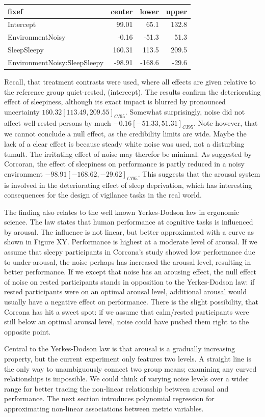 \documentclass[]{svmono}
\theoremstyle{definition}
\theoremstyle{definition}
\theoremstyle{definition}
\theoremstyle{remark}
\begin{document}
\begin{longtable}[]{@{}lrrr@{}}
\toprule
fixef & center & lower & upper\tabularnewline
\midrule
\endhead
Intercept & 99.01 & 65.1 & 132.8\tabularnewline
EnvironmentNoisy & -0.16 & -51.3 & 51.3\tabularnewline
SleepSleepy & 160.31 & 113.5 & 209.5\tabularnewline
EnvironmentNoisy:SleepSleepy & -98.91 & -168.6 & -29.6\tabularnewline
\bottomrule
\end{longtable}

Recall, that treatment contrasts were used, where all effects are given
relative to the reference group quiet-rested, (intercept). The results
confirm the deteriorating effect of sleepiness, although its exact
impact is blurred by pronounced uncertainty
\(160.32 [113.49, 209.55]_{CI95}\). Somewhat surprisingly, noise did not
affect well-rested persons by much \(-0.16 [-51.33, 51.31]_{CI95}\).
Note however, that we cannot conclude a null effect, as the credibility
limits are wide. Maybe the lack of a clear effect is because steady
white noise was used, not a disturbing tumult. The irritating effect of
noise may therefor be minimal. As suggested by Corcoran, the effect of
sleepiness on performance is partly reduced in a noisy environment
\(-98.91 [-168.62, -29.62]_{CI95}\). This suggests that the arousal
system is involved in the deteriorating effect of sleep deprivation,
which has interesting consequences for the design of vigilance tasks in
the real world.

The finding also relates to the well known Yerkes-Dodson law in
ergonomic science. The law states that human performance at cognitive
tasks is influenced by arousal. The influence is not linear, but better
approximated with a curve as shown in Figure XY. Performance is highest
at a moderate level of arousal. If we assume that sleepy participants in
Corcona's study showed low performance due to under-arousal, the noise
perhaps has increased the arousal level, resulting in better
performance. If we except that noise has an arousing effect, the null
effect of noise on rested participants stands in opposition to the
Yerkes-Dodson law: if rested participants were on an optimal arousal
level, additional arousal would usually have a negative effect on
performance. There is the slight possibility, that Corcona has hit a
sweet spot: if we assume that calm/rested participants were still below
an optimal arousal level, noise could have pushed them right to the
opposite point.

Central to the Yerkes-Dodson law is that arousal is a gradually
increasing property, but the current experiment only features two
levels. A straight line is the only way to unambiguously connect two
group means; examining any curved relationships is impossible. We could
think of varying noise levels over a wider range for better tracing the
non-linear relationship between arousal and performance. The next
section introduces polynomial regression for approximating non-linear
associations between metric variables.
\end{document}
